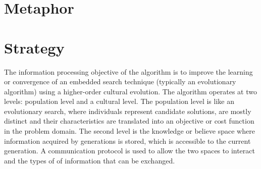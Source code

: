 \documentclass[a4paper, 11pt]{article}
\begin{document}
\section{Metaphor}
\label{sec:metaphor}

\section{Strategy}
\label{sec:strategy}
The information processing objective of the algorithm is to improve the learning or convergence of an embedded search technique (typically an evolutionary algorithm) using a higher-order cultural evolution. 
The algorithm operates at two levels: population level and a cultural level. The population level is like an evolutionary search, where individuals represent candidate solutions, are mostly distinct and their characteristics are translated into an objective or cost function in the problem domain. The second level is the knowledge or believe space where information acquired by generations  is stored, which is accessible to the current generation. A communication protocol is used to allow the two spaces to interact and the types of of information that can be exchanged. 
\end{document}

